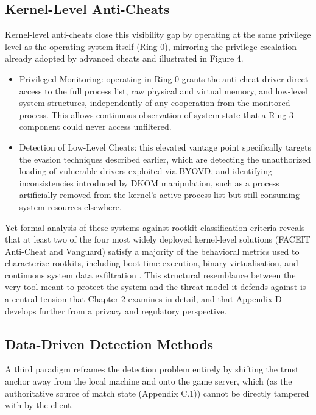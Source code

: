 \subsection{Kernel-Level Anti-Cheats}
\label{sec:one:two:two}

Kernel-level anti-cheats close this visibility gap by operating at the same privilege level as the operating system itself (Ring 0), mirroring the privilege escalation already adopted by advanced cheats and illustrated in Figure 4.

\begin{itemize}
    \item Privileged Monitoring: operating in Ring 0 grants the anti-cheat driver direct access to the full process list, raw physical and virtual memory, and low-level system structures, independently of any cooperation from the monitored process. This allows continuous observation of system state that a Ring 3 component could never access unfiltered.
    \item Detection of Low-Level Cheats: this elevated vantage point specifically targets the evasion techniques described earlier, which are detecting the unauthorized loading of vulnerable drivers exploited via BYOVD, and identifying inconsistencies introduced by DKOM manipulation, such as a process artificially removed from the kernel's active process list but still consuming system resources elsewhere.
\end{itemize}

Yet formal analysis of these systems against rootkit classification criteria reveals that at least two of the four most widely deployed kernel-level solutions (FACEIT Anti-Cheat and Vanguard) satisfy a majority of the behavioral metrics used to characterize rootkits, including boot-time execution, binary virtualisation, and continuous system data exfiltration \cite{Dorner2024}. This structural resemblance between the very tool meant to protect the system and the threat model it defends against is a central tension that Chapter 2 examines in detail, and that Appendix D develops further from a privacy and regulatory perspective.

\subsection{Data-Driven Detection Methods}
\label{sec:one:two:three}

A third paradigm reframes the detection problem entirely by shifting the trust anchor away from the local machine and onto the game server, which (as the authoritative source of match state (Appendix C.1)) cannot be directly tampered with by the client.

